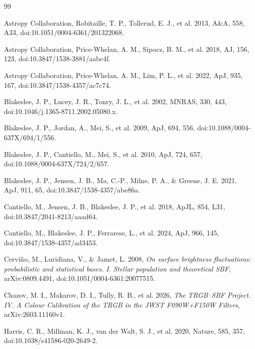 \documentclass[nodoi,nocopyright]{pas}
\begin{document}
\FloatBarrier
\begin{thebibliography}{99}

Astropy Collaboration, Robitaille, T. P., Tollerud, E. J., et al. 2013,
A\&A, 558, A33, doi:10.1051/0004-6361/201322068.

Astropy Collaboration, Price-Whelan, A. M., Sipocz, B. M., et al. 2018,
AJ, 156, 123, doi:10.3847/1538-3881/aabc4f.

Astropy Collaboration, Price-Whelan, A. M., Lim, P. L., et al. 2022,
ApJ, 935, 167, doi:10.3847/1538-4357/ac7c74.

Blakeslee, J. P., Lucey, J. R., Tonry, J. L., et al. 2002,
MNRAS, 330, 443, doi:10.1046/j.1365-8711.2002.05080.x.

Blakeslee, J. P., Jordan, A., Mei, S., et al. 2009,
ApJ, 694, 556, doi:10.1088/0004-637X/694/1/556.

Blakeslee, J. P., Cantiello, M., Mei, S., et al. 2010,
ApJ, 724, 657, doi:10.1088/0004-637X/724/2/657.

Blakeslee, J. P., Jensen, J. B., Ma, C.-P., Milne, P. A., \& Greene, J. E.
2021, ApJ, 911, 65, doi:10.3847/1538-4357/abe86a.

Cantiello, M., Jensen, J. B., Blakeslee, J. P., et al. 2018,
ApJL, 854, L31, doi:10.3847/2041-8213/aaad64.

Cantiello, M., Blakeslee, J. P., Ferrarese, L., et al. 2024,
ApJ, 966, 145, doi:10.3847/1538-4357/ad3453.

Cervi\~no, M., Luridiana, V., \& Jamet, L. 2008,
\emph{On surface brightness fluctuations: probabilistic and statistical
bases. I. Stellar population and theoretical SBF},
arXiv:0809.4491, doi:10.1051/0004-6361:20077515.

Chazov, M. I., Makarov, D. I., Tully, R. B., et al. 2026,
\emph{The TRGB--SBF Project. IV. A Colour Calibration of the TRGB in the
JWST F090W+F150W Filters}, arXiv:2603.11160v1.

Harris, C. R., Millman, K. J., van der Walt, S. J., et al. 2020,
Nature, 585, 357, doi:10.1038/s41586-020-2649-2.


\end{thebibliography}
\end{document}
